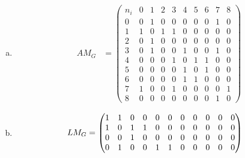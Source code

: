 \documentclass[10pt,letterpaper, cm]{hmcpset}
\begin{document}
\begin{enumerate}[(a)]
    \item 
    
    \begin{align*}

      AM_G &= \begin{pmatrix}


         n_i & 0 & 1 & 2 & 3 & 4 & 5 & 6 & 7 & 8 \\        

         0   & 0 & 1 & 0 & 0 & 0 & 0 & 0 & 1 & 0 \\

         1   & 1 & 0 & 1 & 1 & 0 & 0 & 0 & 0 & 0 \\

         2   & 0 & 1 & 0 & 0 & 0 & 0 & 0 & 0 & 0 \\

         3   & 0 & 1 & 0 & 0 & 1 & 0 & 0 & 1 & 0  \\

         4   & 0 & 0 & 0 & 1 & 0 & 1 & 1 & 0 & 0 \\

         5   & 0 & 0 & 0 & 0 & 1 & 0 & 1 & 0 & 0 \\

         6   & 0 & 0 & 0 & 0 & 1 & 1 & 0 & 0 & 0 \\

         7   & 1 & 0 & 0 & 1 & 0 & 0 & 0 & 0 & 1 \\

         8   & 0 & 0 & 0 & 0 & 0 & 0 & 0 & 1 & 0

      \end{pmatrix}  
              \end{align*}

    \item 
      \begin{align*}
      
      \setcounter{MaxMatrixCols}{20}
     LM_G&=
      \begin{pmatrix}


             1 & 1 & 0 & 0 & 0 & 0 & 0 & 0 & 0 & 0 & 0\\        

             1 & 0 & 1 & 1 & 0 & 0 & 0 & 0 & 0 & 0 & 0\\ 

             0 & 0 & 1 & 0 & 0 & 0 & 0 & 0 & 0 & 0 & 0\\

             0 & 1 & 0 & 0 & 1 & 1 & 0 & 0 & 0 & 0 & 0\\


\end{pmatrix}
\end{align*}
\end{enumerate}
\end{document}
